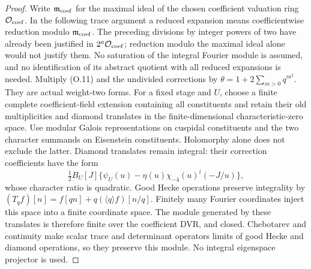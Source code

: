 \begin{proof}
Write $\mathfrak m_{\rm coef}$ for the maximal ideal of the chosen
coefficient valuation ring $\mathcal O_{\rm coef}$. In the following
trace argument a reduced expansion means coefficientwise reduction
modulo $\mathfrak m_{\rm coef}$. The preceding divisions by integer
powers of two have already been justified in $2^a\mathcal O_{\rm coef}$;
reduction modulo the maximal ideal alone would not justify them.
No saturation of the integral Fourier module is assumed, and no
identification of its abstract quotient with all reduced expansions
is needed.
Multiply (O.11) and the undivided corrections by
$\theta=1+2\sum_{m>0}q^{m^2}$. They are actual weight-two forms.
For a fixed stage and $U$, choose a finite complete coefficient-field
extension containing all constituents and retain their old
multiplicities and diamond translates in the finite-dimensional
characteristic-zero space. Use modular Galois representations on
cuspidal constituents and the two character summands on Eisenstein
constituents. Holomorphy alone does not exclude the latter.
Diamond translates remain integral:
their correction coefficients have the form
\[
 \tfrac12 B_U[J]\{\psi_U(u)-\eta(u)\chi_{-4}(u)^i(-J/u)\},
\]
whose character ratio is quadratic. Good Hecke operations preserve
integrality by
$(T_qf)[n]=f[qn]+q(\langle q\rangle f)[n/q]$.
Finitely many Fourier coordinates inject this space into a finite
coordinate space. The module generated by these translates is
therefore finite over the coefficient DVR, and closed.
Chebotarev and continuity make scalar trace and determinant
operators limits of good Hecke and diamond operations, so they
preserve this module. No integral eigenspace projector is used.


\end{proof}

